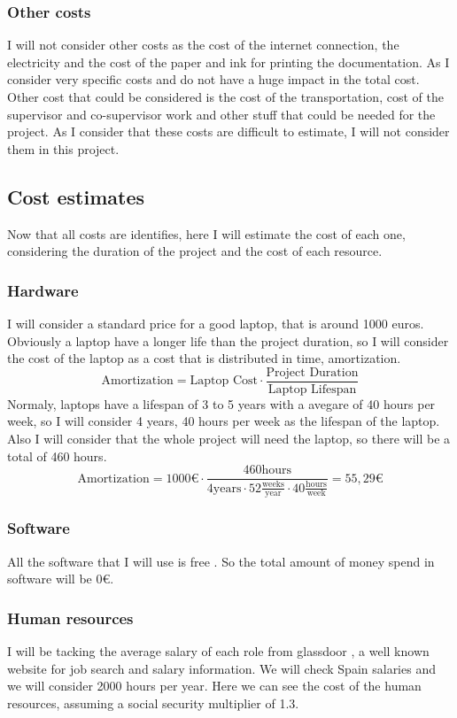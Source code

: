 \subsubsection*{Other costs}
I will not consider other costs as the cost of the internet connection, the electricity and the cost of the paper and ink for printing the documentation.
As I consider very specific costs and do not have a huge impact in the total cost.
Other cost that could be considered is the cost of the transportation, cost of the supervisor and co-supervisor work and other stuff that could be needed for the project.
As I consider that these costs are difficult to estimate, I will not consider them in this project.
\subsection{Cost estimates}
Now that all costs are identifies, here I will estimate the cost of each one, considering the duration of the project and the cost of each resource.
\subsubsection*{Hardware}
I will consider a standard price for a good laptop, that is around 1000 euros.
Obviously a laptop have a longer life than the project duration, so I will consider the cost of the laptop as a cost that is distributed in time, amortization.
$$
\text{Amortization} = \text{Laptop Cost} \cdot \frac{\text{Project Duration}}{\text{Laptop Lifespan}}
$$ 
Normaly, laptops have a lifespan of 3 to 5 years with a avegare of 40 hours per week, so I will consider 4 years, 40 hours per week as the lifespan of the laptop. %
Also I will consider that the whole project will need the laptop, so there will be a total of 460 hours. 
$$
\text{Amortization} = 1000 \text{€} \cdot \frac{460 \text{hours}}{4 \text{years} \cdot 52 \frac{\text{weeks}}{\text{year}} \cdot 40 \frac{\text{hours}}{\text{week}}} = 55,29 \text{€}
$$
\subsubsection*{Software}
All the software that I will use is free \cite{}. So the total amount of money spend in software will be 0€.
\subsubsection*{Human resources}
I will be tacking the average salary of each role from glassdoor \cite{GlassDoorResearcher} \cite{GlassdoorProjectManager}\cite{GlassdoorSoftwareDeveloper}, a well known website for job search and salary information.
We will check Spain salaries and we will consider 2000 hours per year.
Here we can see the cost of the human resources, assuming a social security multiplier of 1.3.

